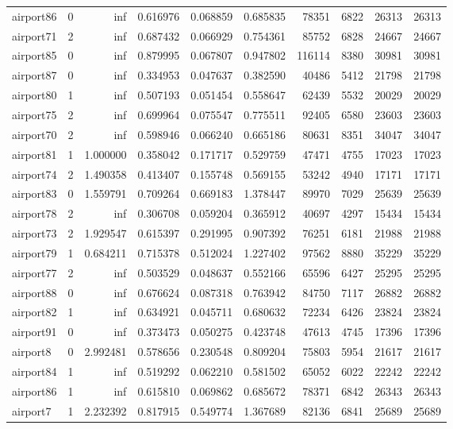 \begin{longtable}{|l|r|r|r|r|r|r|r|r|r|}
airport86 & 0 & inf & 0.616976 & 0.068859 & 0.685835 & 78351 & 6822 & 26313 & 26313 \\
airport71 & 2 & inf & 0.687432 & 0.066929 & 0.754361 & 85752 & 6828 & 24667 & 24667 \\
airport85 & 0 & inf & 0.879995 & 0.067807 & 0.947802 & 116114 & 8380 & 30981 & 30981 \\
airport87 & 0 & inf & 0.334953 & 0.047637 & 0.382590 & 40486 & 5412 & 21798 & 21798 \\
airport80 & 1 & inf & 0.507193 & 0.051454 & 0.558647 & 62439 & 5532 & 20029 & 20029 \\
airport75 & 2 & inf & 0.699964 & 0.075547 & 0.775511 & 92405 & 6580 & 23603 & 23603 \\
airport70 & 2 & inf & 0.598946 & 0.066240 & 0.665186 & 80631 & 8351 & 34047 & 34047 \\
airport81 & 1 & 1.000000 & 0.358042 & 0.171717 & 0.529759 & 47471 & 4755 & 17023 & 17023 \\
airport74 & 2 & 1.490358 & 0.413407 & 0.155748 & 0.569155 & 53242 & 4940 & 17171 & 17171 \\
airport83 & 0 & 1.559791 & 0.709264 & 0.669183 & 1.378447 & 89970 & 7029 & 25639 & 25639 \\
airport78 & 2 & inf & 0.306708 & 0.059204 & 0.365912 & 40697 & 4297 & 15434 & 15434 \\
airport73 & 2 & 1.929547 & 0.615397 & 0.291995 & 0.907392 & 76251 & 6181 & 21988 & 21988 \\
airport79 & 1 & 0.684211 & 0.715378 & 0.512024 & 1.227402 & 97562 & 8880 & 35229 & 35229 \\
airport77 & 2 & inf & 0.503529 & 0.048637 & 0.552166 & 65596 & 6427 & 25295 & 25295 \\
airport88 & 0 & inf & 0.676624 & 0.087318 & 0.763942 & 84750 & 7117 & 26882 & 26882 \\
airport82 & 1 & inf & 0.634921 & 0.045711 & 0.680632 & 72234 & 6426 & 23824 & 23824 \\
airport91 & 0 & inf & 0.373473 & 0.050275 & 0.423748 & 47613 & 4745 & 17396 & 17396 \\
airport8 & 0 & 2.992481 & 0.578656 & 0.230548 & 0.809204 & 75803 & 5954 & 21617 & 21617 \\
airport84 & 1 & inf & 0.519292 & 0.062210 & 0.581502 & 65052 & 6022 & 22242 & 22242 \\
airport86 & 1 & inf & 0.615810 & 0.069862 & 0.685672 & 78371 & 6842 & 26343 & 26343 \\
airport7 & 1 & 2.232392 & 0.817915 & 0.549774 & 1.367689 & 82136 & 6841 & 25689 & 25689 \\

\end{longtable}
